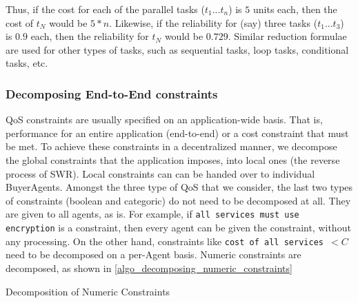 \documentclass[10pt,journal,compsoc]{IEEEtran}
\begin{document}
Thus, if the cost for each of the parallel tasks ($t_{1}...t_{n}$) is $5$ units each, then the cost of $t_{N}$ would be $5 * n$. Likewise, if the reliability for (say) three tasks ($t_{1}...t_{3}$) is $0.9$ each, then the reliability for $t_{N}$ would be $0.729$. Similar reduction formulae \cite{Cardoso2004Quality} are used for other types of tasks, such as sequential tasks, loop tasks, conditional tasks, etc.


\subsubsection{Decomposing End-to-End constraints\label{decomposing_constraints}} QoS constraints are usually specified on an application-wide basis. That is, performance for an entire application (end-to-end) or a cost constraint that must be met. To achieve these constraints in a decentralized manner, we decompose the global constraints that the application imposes, into local ones (the reverse process of SWR). Local constraints can can be handed over to individual BuyerAgents. Amongst the three type of QoS that we consider, the last two types of constraints (boolean and categoric) do not need to be decomposed at all. They are given to all agents, as is. For example, if \texttt{all services must use encryption} is a constraint, then every agent can be given the constraint, without any processing. On the other hand, constraints like \texttt{cost of all services $< C$} need to be decomposed on a per-Agent basis. Numeric constraints are decomposed, as shown in \ref{algo_decomposing_numeric_constraints}

\begin{algorithm}
 \DontPrintSemicolon
 \caption{Decomposition of Numeric Constraints \label{algo_decomposing_numeric_constraints}}
\end{algorithm}
\end{document}
